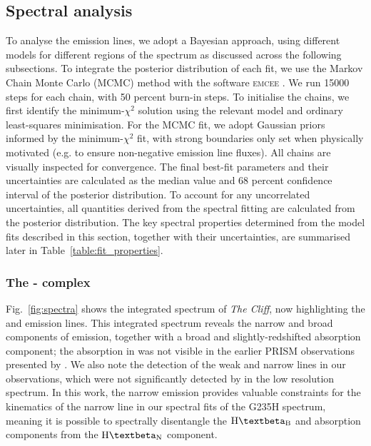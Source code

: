 \documentclass[fleqn,usenatbib]{mnras}
\newcommand{\Hbeta}{\text{H\textbeta}\xspace}
\newcommand{\OIIIall}{\forbiddenEL[O][iii][\textlambda][\textlambda][4959,][5007]}
\newcommand{\cliff}{\textit{The Cliff}\xspace}
\begin{document}
\subsection{Spectral analysis}\label{sec:line_measure_methods}
To analyse the emission lines, we adopt a Bayesian approach, using different models for different regions of the spectrum as discussed across the following subsections. 
To integrate the posterior distribution of each fit, we use the Markov Chain Monte Carlo (MCMC) method with the software \textsc{emcee} \citep{emcee2013}. 
We run 15000 steps for each chain, with 50 percent burn-in steps.
To initialise the chains, we first identify the minimum-$\chi^2$ solution using the relevant model and ordinary least-squares minimisation. 
For the MCMC fit, we adopt Gaussian priors informed by the minimum-$\chi^2$  fit, with strong boundaries only set when physically motivated (e.g. to ensure non-negative emission line fluxes). 
All chains are visually inspected for convergence. 
The final best-fit parameters and their uncertainties are calculated as the median value and 68 percent confidence interval of the posterior distribution. 
To account for any uncorrelated uncertainties, all quantities derived from the spectral fitting are calculated from the posterior distribution. 
The key spectral properties determined from the model fits described in this section, together with their uncertainties, are summarised later in Table~\ref{table:fit_properties}.





\subsubsection{The \texorpdfstring{\Hbeta-\OIIIL}{HbO3} complex}\label{sec:fitting_Hb_OIII}

Fig.~\ref{fig:spectra} shows the integrated spectrum of \cliff, now highlighting the \Hbeta and \OIIIall emission lines. 
This integrated spectrum reveals the narrow and broad components of \Hbeta emission, together with a broad and slightly-redshifted absorption component; the absorption in \Hbeta was not visible in the earlier PRISM observations presented by \cite{deGraaff2025}. 
We also note the detection of the weak and narrow \OIIIall lines in our observations, which were not significantly detected by \cite{deGraaff2025} in the low resolution spectrum. 
In this work, the narrow \OIIIL emission provides valuable constraints for the kinematics of the narrow \Hbeta line in our spectral fits of the G235H spectrum, meaning it is possible to spectrally disentangle the $\Hbeta_\mathrm{B}$ and absorption components from the $\Hbeta_\mathrm{N}$ component. 
\end{document}
